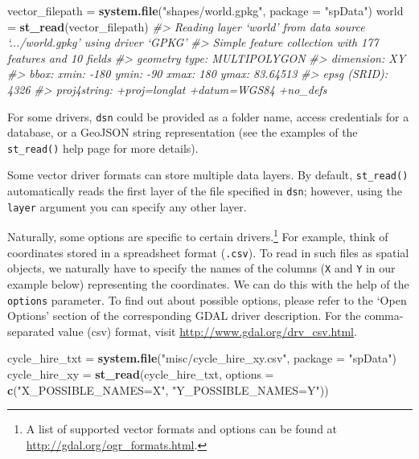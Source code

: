 \documentclass[]{krantz}
\newenvironment{Shaded}{\begin{snugshade}}{\end{snugshade}}
\newcommand{\CommentTok}[1]{\textcolor[rgb]{0.37,0.37,0.37}{\textit{#1}}}
\newcommand{\DataTypeTok}[1]{\textcolor[rgb]{0.27,0.27,0.27}{#1}}
\newcommand{\KeywordTok}[1]{\textcolor[rgb]{0.27,0.27,0.27}{\textbf{#1}}}
\newcommand{\NormalTok}[1]{#1}
\newcommand{\StringTok}[1]{\textcolor[rgb]{0.5,0.5,0.5}{#1}}
\let\rmarkdownfootnote\footnote%
\def\footnote{\protect\rmarkdownfootnote}
\begin{document}
\begin{Shaded}
\begin{Highlighting}[]
\NormalTok{vector_filepath =}\StringTok{ }\KeywordTok{system.file}\NormalTok{(}\StringTok{"shapes/world.gpkg"}\NormalTok{, }\DataTypeTok{package =} \StringTok{"spData"}\NormalTok{)}
\NormalTok{world =}\StringTok{ }\KeywordTok{st_read}\NormalTok{(vector_filepath)}
\CommentTok{#> Reading layer `world' from data source `.../world.gpkg' using driver `GPKG'}
\CommentTok{#> Simple feature collection with 177 features and 10 fields}
\CommentTok{#> geometry type:  MULTIPOLYGON}
\CommentTok{#> dimension:      XY}
\CommentTok{#> bbox:           xmin: -180 ymin: -90 xmax: 180 ymax: 83.64513}
\CommentTok{#> epsg (SRID):    4326}
\CommentTok{#> proj4string:    +proj=longlat +datum=WGS84 +no_defs}
\end{Highlighting}
\end{Shaded}

For some drivers, \texttt{dsn} could be provided as a folder name, access credentials for a database, or a GeoJSON string representation (see the examples of the \texttt{st\_read()} help page for more details).

Some vector driver formats can store multiple data layers.
By default, \texttt{st\_read()} automatically reads the first layer of the file specified in \texttt{dsn}; however, using the \texttt{layer} argument you can specify any other layer.

Naturally, some options are specific to certain drivers.\footnote{A list of supported vector formats and options can be found at \url{http://gdal.org/ogr_formats.html}.}
For example, think of coordinates stored in a spreadsheet format (\texttt{.csv}).
To read in such files as spatial objects, we naturally have to specify the names of the columns (\texttt{X} and \texttt{Y} in our example below) representing the coordinates.
We can do this with the help of the \texttt{options} parameter.
To find out about possible options, please refer to the `Open Options' section of the corresponding GDAL driver description.
For the comma-separated value (csv) format, visit \url{http://www.gdal.org/drv_csv.html}.

\begin{Shaded}
\begin{Highlighting}[]
\NormalTok{cycle_hire_txt =}\StringTok{ }\KeywordTok{system.file}\NormalTok{(}\StringTok{"misc/cycle_hire_xy.csv"}\NormalTok{, }\DataTypeTok{package =} \StringTok{"spData"}\NormalTok{)}
\NormalTok{cycle_hire_xy =}\StringTok{ }\KeywordTok{st_read}\NormalTok{(cycle_hire_txt, }\DataTypeTok{options =} \KeywordTok{c}\NormalTok{(}\StringTok{"X_POSSIBLE_NAMES=X"}\NormalTok{,}
                                                    \StringTok{"Y_POSSIBLE_NAMES=Y"}\NormalTok{))}
\end{Highlighting}
\end{Shaded}
\end{document}
